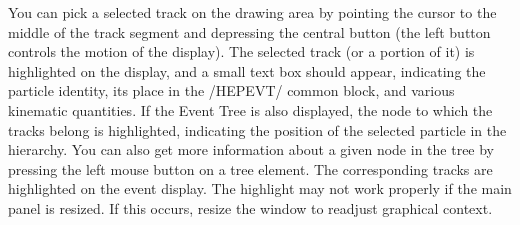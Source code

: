 You can pick a selected track on the drawing area by pointing 
the cursor to the middle of the track segment and depressing 
the central button (the left button controls the motion of the display). 
The selected track (or a portion of it) is highlighted on the display, 
and a small text box should appear, 
indicating the particle identity, its place in the /HEPEVT/ common block, 
and various kinematic quantities. If the Event Tree is also displayed,
the node to which the tracks belong is highlighted, 
indicating the position of the selected particle in the hierarchy.
You can also get more information about a given node in the tree
by pressing  the left mouse button on a tree element.
The corresponding tracks are  highlighted on the event display.
The highlight may not work properly if the main panel is resized.
If this occurs, resize the window to readjust graphical context.

